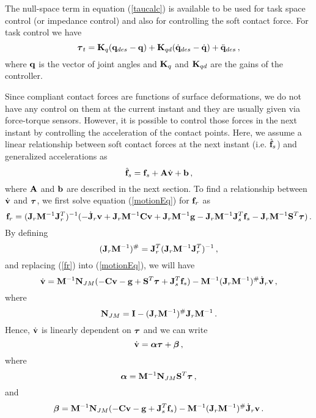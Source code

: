 \documentclass[a4paper, 11pt]{article}
\begin{document}
The null-space term in equation (\ref{taucalc}) is available to be used for
task space control (or impedance control) and also for controlling the soft
contact force.  For task control we have
%
\begin{equation}
  \boldsymbol{\tau}_t = \mathbf{K}_q (\mathbf{q}_{des} - \mathbf{q}) + \mathbf{K}_{qd} (\dot{\mathbf{q}}_{des} - \dot{\mathbf{q}}) +
  \ddot{\mathbf{q}}_{des} \, ,
  \label{tauImp}
\end{equation}
%
where $\mathbf{q}$ is the vector of joint angles and $\mathbf{K}_q$ and $\mathbf{K}_{qd}$ are the
gains of the controller.

Since compliant contact forces are functions of surface deformations, we do
not have any control on them at the current instant and they are usually given
via force-torque sensors.  However, it is possible to control those forces in
the next instant by controlling the acceleration of the contact points.  Here,
we assume a linear relationship between soft contact forces at the next
instant (i.e. $\hat{\mathbf{f}}_s$) and generalized accelerations as
%
\begin{equation}
  \hat{\mathbf{f}}_s = \mathbf{f}_s + \mathbf{A} \dot{\mathbf{v}} + \mathbf{b} \, ,
  \label{fs_hat}
\end{equation}
%
where $\mathbf{A}$ and $\mathbf{b}$ are described in the next section.  To find a
relationship between $\dot{\mathbf{v}}$ and $\boldsymbol{\tau}$, we first solve equation
(\ref{motionEq}) for $\mathbf{f}_r$ as
%
\begin{equation}
  \mathbf{f}_r = (\mathbf{J}_r \mathbf{M}^{-1} \mathbf{J}_r^T)^{-1} (-\dot{\mathbf{J}}_r \mathbf{v} + \mathbf{J}_r \mathbf{M}^{-1} \mathbf{C}
  \mathbf{v} + \mathbf{J}_r \mathbf{M}^{-1} \mathbf{g} - \mathbf{J}_r \mathbf{M}^{-1} \mathbf{J}_s^T \mathbf{f}_s - \mathbf{J}_r \mathbf{M}^{-1}
  \mathbf{S}^T \boldsymbol{\tau}) \, .
  \label{fr}
\end{equation}
%
By defining
%
\begin{equation}
  (\mathbf{J}_r \mathbf{M}^{-1})^{\#} = \mathbf{J}_r^T (\mathbf{J}_r \mathbf{M}^{-1} \mathbf{J}_r^T)^{-1} \, ,
\end{equation}
%
and replacing (\ref{fr}) into (\ref{motionEq}), we will have
%
\begin{equation}
  \dot{\mathbf{v}} = \mathbf{M}^{-1} \mathbf{N}_{JM} (-\mathbf{C} \mathbf{v} - \mathbf{g} + \mathbf{S}^T \boldsymbol{\tau} + \mathbf{J}_s^T \mathbf{f}_s)
  - \mathbf{M}^{-1} (\mathbf{J}_r \mathbf{M}^{-1})^{\#} \dot{\mathbf{J}}_r \mathbf{v} \, ,
\end{equation}
%
where
%
\begin{equation}
  \mathbf{N}_{JM} = \mathbf{I} - (\mathbf{J}_r \mathbf{M}^{-1})^{\#} \mathbf{J}_r \mathbf{M}^{-1} \, .
\end{equation}
%
Hence, $\dot{\mathbf{v}}$ is linearly dependent on $\boldsymbol{\tau}$ and we can write
%
\begin{equation}
  \dot{\mathbf{v}} = \boldsymbol{\alpha} \boldsymbol{\tau} + \boldsymbol{\beta} \, ,
  \label{vdot_tau}
\end{equation}
%
where
%
\begin{equation}
  \boldsymbol{\alpha} = \mathbf{M}^{-1} \mathbf{N}_{JM} \mathbf{S}^T \boldsymbol{\tau} \, ,
\end{equation}
%
and
%
\begin{equation}
  \boldsymbol{\beta} = \mathbf{M}^{-1} \mathbf{N}_{JM} (-\mathbf{C} \mathbf{v} - \mathbf{g} + \mathbf{J}_s^T \mathbf{f}_s) - \mathbf{M}^{-1}
  (\mathbf{J}_r \mathbf{M}^{-1})^{\#} \dot{\mathbf{J}}_r \mathbf{v} \, .
\end{equation}
%
\end{document}
